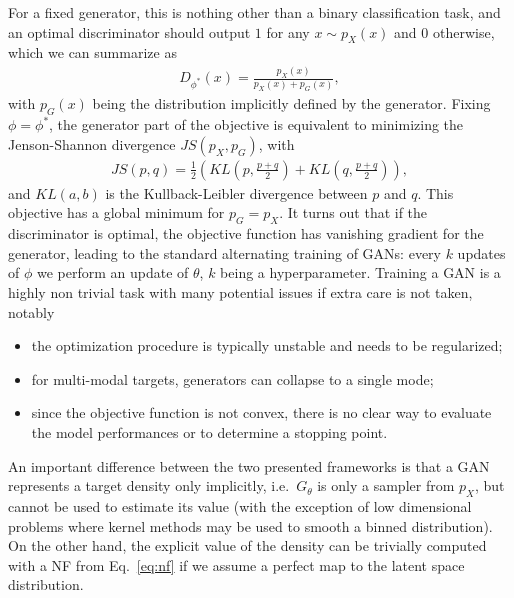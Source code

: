 %
For a fixed generator, this is nothing other than a binary classification task, and an optimal discriminator should output $1$ for any $x \sim p_{X}(x)$ and $0$ otherwise, which we can summarize as
%
\begin{align}
D_{\phi^{*}}(x) = \frac{p_{X}(x)}{p_{X}(x) + p_{G}(x)},
\end{align}
%
with $p_{G}(x)$ being the distribution implicitly defined by the generator. 
Fixing $\phi = \phi^{*}$, the generator part of the objective is equivalent to minimizing the Jenson-Shannon divergence $JS(p_{X}, p_{G})$, with
%
\begin{align}
JS\left(p, q\right) = \frac{1}{2} \left(KL\left(p, \frac{p + q}{2}\right) + KL\left(q, \frac{p + q}{2}\right) \right),
\end{align}
%
and $KL(a, b)$ is the Kullback-Leibler divergence between $p$ and $q$. This objective has a global minimum for $p_{G} = p_{X}$.
It turns out that if the discriminator is optimal, the objective function has vanishing gradient for the generator, leading to the standard alternating training of GANs: every $k$ updates of $\phi$ we perform an update of $\theta$, $k$ being a hyperparameter.
Training a GAN is a highly non trivial task with many potential issues if extra care is not taken, notably
\begin{itemize}
\item
the optimization procedure is typically unstable and needs to be regularized;
\item
for multi-modal targets, generators can collapse to a single mode;
\item
since the objective function is not convex, there is no clear way to evaluate the model performances or to determine a stopping point.
\end{itemize}

An important difference between the two presented frameworks is that a GAN represents a target density only implicitly, i.e.\    $G_{\theta}$ is only a sampler from $p_{X}$, but cannot be used to estimate its value (with the exception of low dimensional problems where kernel methods may be used to smooth a binned distribution). On the other hand, the explicit value of the density can be trivially computed with a NF from Eq.~\ref{eq:nf} if we assume a perfect map to the latent space distribution.

